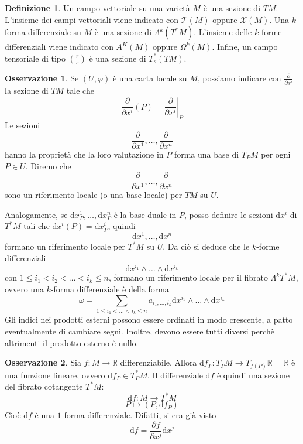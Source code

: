 \documentclass[a4paper,11pt]{article}
\theoremstyle{definition}
\newtheorem{osservazione}{Osservazione}[section]
\newtheorem{definizione}{Definizione}[section]
\theoremstyle{theorem}
\begin{document}
\begin{definizione}
	Un campo vettoriale su una varietà $M$ è una sezione di $TM$. L'insieme dei campi vettoriali viene indicato con $\mathcal{T}(M)$ oppure $\mathcal{X}(M)$.
	Una $k$-forma differenziale su $M$ è una sezione di $\Lambda^k(T^*M)$. L'insieme delle $k$-forme differenziali viene indicato con $A^K(M)$ oppure $\Omega^k(M)$.
	Infine, un campo tensoriale di tipo $\binom{r}{s}$ è una sezione di $T^*_s(TM)$.
\end{definizione}
\begin{osservazione}
	Se $(U,\varphi)$ è una carta locale su $M$, possiamo indicare con $\frac{\partial}{\partial x^i}$ la sezione di $TM$ tale che \[\frac{\partial}{\partial x^i}(P)=\left.\frac{\partial}{\partial x^i}\right|_P\]
	Le sezioni
	\[\frac{\partial}{\partial x^1},\dots,\frac{\partial}{\partial x^n}\]
	hanno la proprietà che la loro valutazione in $P$ forma una base di $T_PM$ per ogni $P\in U$. Diremo che
	\[\frac{\partial}{\partial x^1},\dots,\frac{\partial}{\partial x^n}\]
	sono un riferimento locale (o una base locale) per $TM$ su $U$.
	
	Analogamente, se $\mathrm{d}x^1_P,\dots,\mathrm{d}x^n_P$ è la base duale in $P$, posso definire le sezioni $\mathrm{d}x^i$ di $T^*M$ tali che $\mathrm{d}x^i(P)=\mathrm{d}x^i_P$, quindi
	\[\mathrm{d}x^1,\dots,\mathrm{d}x^n\]
	formano un riferimento locale per $T^*M$ su $U$. Da ciò si deduce che le $k$-forme differenziali
	\[\mathrm{d}x^{i_1}\wedge\dots\wedge\mathrm{d}x^{i_k}\]
	con $1\leq i_1<i_2<\dots<i_k\leq n$, formano un riferimento locale per il fibrato $\Lambda^kT^*M$, ovvero una $k$-forma differenziale è della forma
	\[\omega=\sum_{1\leq i_1<\dots<i_k\leq n}a_{i_1,\dots,i_k}\mathrm{d}x^{i_1}\wedge\dots\wedge\mathrm{d}x^{i_k}\]
	Gli indici nei prodotti esterni possono essere ordinati in modo crescente, a patto eventualmente di cambiare segni. Inoltre, devono essere tutti diversi perchè altrimenti il prodotto esterno è nullo.
\end{osservazione}
\begin{osservazione}
	Sia $f\colon M\to\mathbb{R}$ differenziabile. Allora $\mathrm{d}f_P\colon T_PM\to T_{f(P)}\mathbb{R}=\mathbb{R}$ è una funzione lineare, ovvero $\mathrm{d}f_P\in T^*_PM$. Il differenziale $\mathrm{d}f$ è quindi una sezione del fibrato cotangente $T^*M$:
	\[\mathrm{d}f\colon M\to T^*M\]
	\[P\mapsto (P,\mathrm{d}f_P)\]
	Cioè $\mathrm{d}f$ è una $1$-forma differenziale.
	Difatti, si era già visto
	\[\mathrm{d}f=\frac{\partial f}{\partial x^j}\mathrm{d}x^j\]
\end{osservazione}
\newpage
\end{document}
